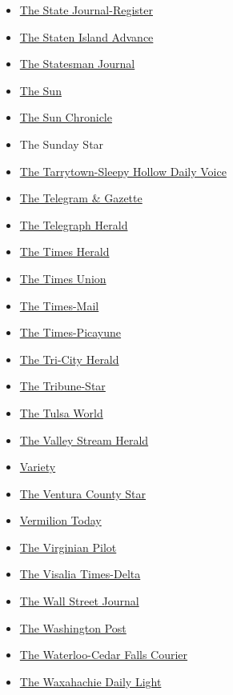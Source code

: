 \begin{itemize}
\item
  \href{https://www.sj-r.com/}{The State Journal-Register}
\item
  \href{https://www.silive.com/}{The Staten Island Advance}
\item
  \href{https://www.statesmanjournal.com/}{The Statesman Journal}
\item
  \href{https://www.lowellsun.com/}{The Sun}
\item
  \href{https://www.thesunchronicle.com/}{The Sun Chronicle}
\item
  The Sunday Star
\item
  \href{https://dailyvoice.com/new-york/tarrytown/}{The Tarrytown-Sleepy
  Hollow Daily Voice}
\item
  \href{https://www.telegram.com/}{The Telegram \& Gazette}
\item
  \href{https://www.telegraphherald.com/}{The Telegraph Herald}
\item
  \href{https://www.thetimesherald.com/}{The Times Herald}
\item
  \href{https://www.timesunion.com/}{The Times Union}
\item
  \href{https://www.hoosiertimes.com/tmnews/}{The Times-Mail}
\item
  \href{https://www.nola.com/}{The Times-Picayune}
\item
  \href{https://www.tri-cityherald.com/}{The Tri-City Herald}
\item
  \href{https://www.tribstar.com/}{The Tribune-Star}
\item
  \href{https://www.tulsaworld.com/}{The Tulsa World}
\item
  \href{https://www.liherald.com/valleystream/}{The Valley Stream
  Herald}
\item
  \href{https://variety.com/}{Variety}
\item
  \href{https://www.vcstar.com/}{The Ventura County Star}
\item
  \href{https://www.vermiliontoday.com/}{Vermilion Today}
\item
  \href{https://www.pilotonline.com/}{The Virginian Pilot}
\item
  \href{https://www.visaliatimesdelta.com/}{The Visalia Times-Delta}
\item
  \href{https://www.wsj.com/}{The Wall Street Journal}
\item
  \href{https://www.washingtonpost.com/}{The Washington Post}
\item
  \href{https://wcfcourier.com/}{The Waterloo-Cedar Falls Courier}
\item
  \href{https://www.waxahachietx.com/}{The Waxahachie Daily Light}
\end{itemize}

